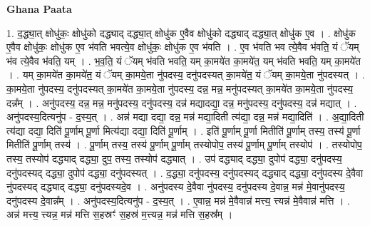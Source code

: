 \documentclass[17pt]{extarticle}
\begin{document}
\textbf{Ghana Paata } \newline

1. द॒द्ध्या॒त् क्षोधु॑कः॒ क्षोधु॑को दद्ध्याद् दद्ध्या॒त् क्षोधु॑क ए॒वैव क्षोधु॑को दद्ध्याद् दद्ध्या॒त् क्षोधु॑क ए॒व । . क्षोधु॑क ए॒वैव क्षोधु॑कः॒ क्षोधु॑क ए॒व भ॑वति भवत्ये॒व क्षोधु॑कः॒ क्षोधु॑क ए॒व भ॑वति । . ए॒व भ॑वति भव त्ये॒वैव भ॑वति॒ यं ॅयम् भ॑व त्ये॒वैव भ॑वति॒ यम् । . भ॒व॒ति॒ यं ॅयम् भ॑वति भवति॒ यम् का॒मये॑त का॒मये॑त॒ यम् भ॑वति भवति॒ यम् का॒मये॑त । . यम् का॒मये॑त का॒मये॑त॒ यं ॅयम् का॒मये॒ता नु॑पदस्य॒ दनु॑पदस्यत् का॒मये॑त॒ यं ॅयम् का॒मये॒ता नु॑पदस्यत् । . का॒मये॒ता नु॑पदस्य॒ दनु॑पदस्यत् का॒मये॑त का॒मये॒ता नु॑पदस्य॒ दन्न॒ मन्न॒ मनु॑पदस्यत् का॒मये॑त का॒मये॒ता नु॑पदस्य॒ दन्न᳚म् । . अनु॑पदस्य॒ दन्न॒ मन्न॒ मनु॑पदस्य॒ दनु॑पदस्य॒ दन्न॑ मद्यादद्या॒ दन्न॒ मनु॑पदस्य॒ दनु॑पदस्य॒ दन्न॑ मद्यात् । . अनु॑पदस्य॒दित्यनु॑प - द॒स्य॒त् । . अन्न॑ मद्या दद्या॒ दन्न॒ मन्न॑ मद्या॒दिती त्य॑द्या॒ दन्न॒ मन्न॑ मद्या॒दिति॑ । . अ॒द्या॒दिती त्य॑द्या दद्या॒ दिति॑ पू॒र्णाम् पू॒र्णा मित्य॑द्या दद्या॒ दिति॑ पू॒र्णाम् । . इति॑ पू॒र्णाम् पू॒र्णा मितीति॑ पू॒र्णाम् तस्य॒ तस्य॑ पू॒र्णा मितीति॑ पू॒र्णाम् तस्य॑ । . पू॒र्णाम् तस्य॒ तस्य॑ पू॒र्णाम् पू॒र्णाम् तस्योपोप॒ तस्य॑ पू॒र्णाम् पू॒र्णाम् तस्योप॑ । . तस्योपोप॒ तस्य॒ तस्योप॑ दद्ध्याद् दद्ध्या॒ दुप॒ तस्य॒ तस्योप॑ दद्ध्यात् । . उप॑ दद्ध्याद् दद्ध्या॒ दुपोप॑ दद्ध्या॒ दनु॑पदस्य॒ दनु॑पदस्यद् दद्ध्या॒ दुपोप॑ दद्ध्या॒ दनु॑पदस्यत् । . द॒द्ध्या॒ दनु॑पदस्य॒ दनु॑पदस्यद् दद्ध्याद् दद्ध्या॒ दनु॑पदस्य दे॒वैवा नु॑पदस्यद् दद्ध्याद् दद्ध्या॒ दनु॑पदस्यदे॒व । . अनु॑पदस्य दे॒वैवा नु॑पदस्य॒ दनु॑पदस्य दे॒वान्न॒ मन्न॑ मे॒वानु॑पदस्य॒ दनु॑पदस्य दे॒वान्न᳚म् । . अनु॑पदस्य॒दित्यनु॑प - द॒स्य॒त् । . ए॒वान्न॒ मन्न॑ मे॒वैवान्न॑ मत्त्य॒ त्त्यन्न॑ मे॒वैवान्न॑ मत्ति । . अन्न॑ मत्त्य॒ त्त्यन्न॒ मन्न॑ मत्ति स॒हस्रꣳ॑ स॒हस्र॑ म॒त्त्यन्न॒ मन्न॑ मत्ति स॒हस्र᳚म् । \newline
\end{document}
